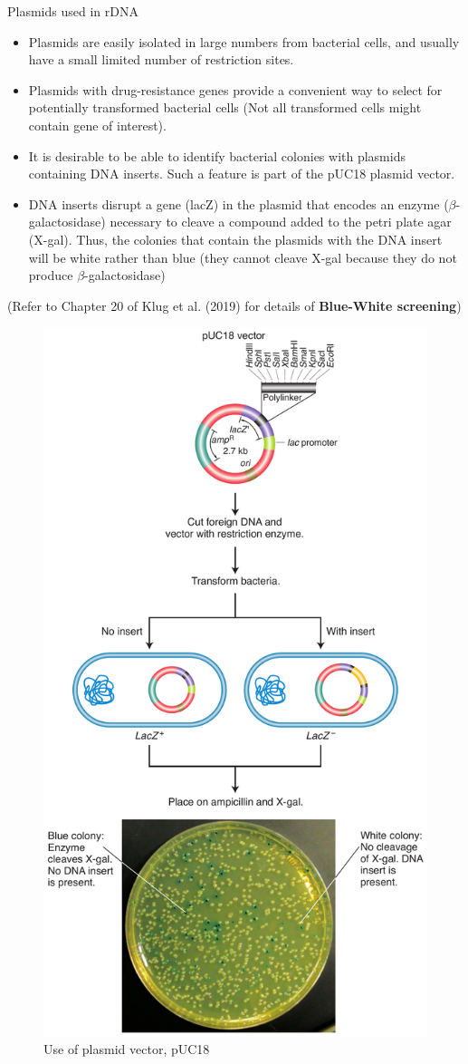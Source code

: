 \documentclass[11pt,dvipsnames,ignorenonframetext,aspectratio=169]{beamer}
\providecommand{\tightlist}{%
  \setlength{\itemsep}{0pt}\setlength{\parskip}{0pt}}
\begin{document}
\begin{frame}{Plasmids used in rDNA}
\protect\hypertarget{plasmids-used-in-rdna}{}
\begin{itemize}
\tightlist
\item
  Plasmids are easily isolated in large numbers from bacterial cells,
  and usually have a small limited number of restriction sites.
\item
  Plasmids with drug-resistance genes provide a convenient way to select
  for potentially transformed bacterial cells (Not all transformed cells
  might contain gene of interest).
\item
  It is desirable to be able to identify bacterial colonies with
  plasmids containing DNA inserts. Such a feature is part of the pUC18
  plasmid vector.
\item
  DNA inserts disrupt a gene (lacZ) in the plasmid that encodes an
  enzyme (\(\beta\)-galactosidase) necessary to cleave a compound added
  to the petri plate agar (X-gal). Thus, the colonies that contain the
  plasmids with the DNA insert will be white rather than blue (they
  cannot cleave X-gal because they do not produce
  \(\beta\)-galactosidase)
\end{itemize}

(Refer to Chapter 20 of Klug et al. (2019) for details of
\textbf{Blue-White screening})
\end{frame}

\begin{frame}{}
\protect\hypertarget{section-18}{}
\begin{figure}
\includegraphics[width=0.25\linewidth]{./../images/plasmid_vector_pUC18} \caption{Use of plasmid vector, pUC18}\label{fig:phage-vector}
\end{figure}
\end{frame}
\end{document}

